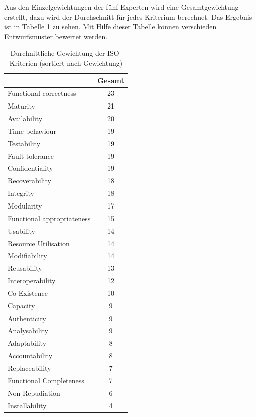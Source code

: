 Aus den Einzelgewichtungen der fünf Experten wird eine Gesamtgewichtung erstellt, dazu wird der Durchschnitt für jedes Kriterium berechnet. Das Ergebnis ist in Tabelle \ref{tab:gesamtgewichtung} zu sehen. Mit Hilfe dieser Tabelle können verschieden Entwurfsmuster bewertet werden.

\begin{table}[htb]
	\caption[Gesamtgewichtung]{Durchnittliche Gewichtung der ISO-Kriterien (sortiert nach Gewichtung)}
	\label{tab:gesamtgewichtung}
	\centering
	\small
	\begin{tabular}{|l|c|}
		\hline
		                           & Gesamt \\ \hline
		Functional correctness     &   23   \\ \hline
		Maturity                   &   21   \\ \hline
		Availability               &   20   \\ \hline
		Time-behaviour             &   19   \\ \hline
		Testability                &   19   \\ \hline
		Fault tolerance            &   19   \\ \hline
		Confidentiality            &   19   \\ \hline
		Recoverability             &   18   \\ \hline
		Integrity                  &   18   \\ \hline
		Modularity                 &   17   \\ \hline
		Functional appropriateness &   15   \\ \hline
		Usability                  &   14   \\ \hline
		Resource Utilisation       &   14   \\ \hline
		Modifiability              &   14   \\ \hline
		Reusability                &   13   \\ \hline
		Interoperability           &   12   \\ \hline
		Co-Existence               &   10   \\ \hline
		Capacity                   &   9    \\ \hline
		Authenticity               &   9    \\ \hline
		Analysability              &   9    \\ \hline
		Adaptability               &   8    \\ \hline
		Accountability             &   8    \\ \hline
		Replaceability             &   7    \\ \hline
		Functional Completeness    &   7    \\ \hline
		Non-Repudiation            &   6    \\ \hline
		Installability             &   4    \\ \hline
	\end{tabular}
\end{table}

